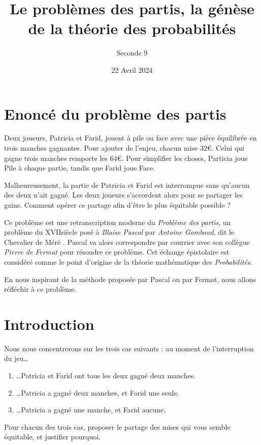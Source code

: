 \documentclass{article}
\title{Le problèmes des partis, la génèse de la théorie des probabilités}
\date{22 Avril 2024}
\author{Seconde 9}
\begin{document}
\maketitle

\section{Enoncé du problème des partis}
\begin{tcolorbox}
Deux joueurs, Patricia et Farid, jouent à pile ou face avec une pièce équilibrée en trois manches gagnantes. Pour ajouter de l'enjeu, chacun mise $32 €$. Celui qui gagne trois manches remporte les $64 €$. Pour simplifier les choses, Particia joue Pile à chaque partie, tandis que Farid joue Face.  

Malheureusement, la partie de Patricia et Farid est interrompue sans qu'aucun des deux n'ait gagné. Les deux joueurs s'accordent alors pour se partager les gains. Comment opérer ce partage afin d'être le plus équitable possible ?
\end{tcolorbox}

Ce problème est une retranscription moderne du \emph{Problème des partis}, un problème du \textsc{XVII}\ieme siècle posé à \emph{Blaise Pascal} par \emph{Antoine Gombaud}, dit \og le Chevalier de Méré \fg. Pascal va alors correspondre par courrier avec son collègue \emph{Pierre de Fermat} pour résoudre ce problème. Cet échange épistolaire est considéré comme le point d'origine de la théorie mathématique des \emph{Probabilités}.

En nous inspirant de la méthode proposée par Pascal ou par Fermat, nous allons réfléchir à ce problème.

\section{Introduction}
Nous nous concentrerons sur les trois cas suivants : au moment de l'interruption du jeu\dots
\begin{enumerate}
\item \dots Patricia et Farid ont tous les deux gagné deux manches.\label{22}
\item \dots Patricia a gagné deux manches, et Farid une seule.\label{21}
\item \dots Patricia a gagné une manche, et Farid aucune.\label{20}
\end{enumerate}
\begin{tcolorbox}
Pour chacun des trois cas, proposer le partage des mises qui vous semble équitable, et justifier pourquoi.
\end{tcolorbox}
\end{document}
